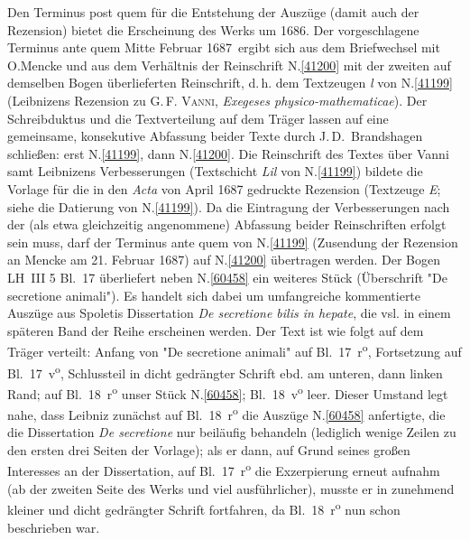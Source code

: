 \begin{ledgroup}
\pstart
Den Terminus post quem für die Entstehung der Auszüge (damit auch der Rezension)
bietet die Erscheinung des Werks um 1686.
Der vorgeschlagene Terminus ante quem \glqq Mitte Februar 1687\grqq\ 
ergibt sich aus dem Briefwechsel mit O.\;Mencke
und aus dem Verhältnis der Reinschrift N.\;\ref{41200} mit der zweiten auf demselben Bogen überlieferten Reinschrift, d.\,h. dem Textzeugen \textit{l} von N.\;\ref{41199} (Leibnizens Rezension zu
\indexN{\textls{Vanni}, Giovanni Francesco 1638\textendash1709}\textsc{G.\,F. Vanni}, \cite{02000}\textit{Exegeses physico-mathematicae}).
Der Schreibduktus und die Textverteilung auf dem Träger lassen auf eine gemeinsame, konsekutive Abfassung beider Texte durch J.\,D.~Brandshagen schließen: erst N.\;\ref{41199}, dann N.\;\ref{41200}.
Die Reinschrift des Textes über Vanni samt Leibnizens Verbesserungen (Textschicht \textit{Lil}  von N.\;\ref{41199})
bildete die Vorlage für die in den \cite{01023}\textit{Acta} von April 1687
gedruckte Rezension (Textzeuge \textit{E}; siehe die Datierung von N.\;\ref{41199}).
Da die Eintragung der Verbesserungen nach der (als etwa gleichzeitig angenommene) Abfassung beider Reinschriften erfolgt sein muss,
darf der Terminus ante quem von N.\;\ref{41199} (Zusendung der Rezension an Mencke am 21. Februar 1687) auf N.\;\ref{41200} übertragen werden.
\pend
\pstart
Der Bogen LH~III 5 Bl.~17 überliefert neben N.\;\ref{60458} ein weiteres Stück (Überschrift "De secretione animali"). Es handelt sich dabei um umfangreiche kommentierte Auszüge aus Spoletis Dissertation \textit{De secretione bilis in hepate}, die vsl. in einem späteren Band der Reihe erscheinen werden.
Der Text ist wie folgt auf dem Träger verteilt: Anfang von "De secretione animali" auf Bl.~17~r\textsuperscript{o}, Fortsetzung auf Bl.~17~v\textsuperscript{o}, Schlussteil in dicht gedrängter Schrift ebd. am unteren, dann linken Rand; auf Bl.~18~r\textsuperscript{o} unser Stück N.\;\ref{60458}; Bl.~18~v\textsuperscript{o} leer.
Dieser Umstand legt nahe, dass Leibniz zunächst auf Bl.~18~r\textsuperscript{o} die Auszüge N.\;\ref{60458}
anfertigte, die die Dissertation \textit{De secretione} nur beiläufig behandeln (lediglich wenige Zeilen zu den ersten drei Seiten der Vorlage);
als er dann, auf Grund seines großen Interesses an der Dissertation, auf Bl.~17~r\textsuperscript{o} die Exzerpierung erneut aufnahm (ab der zweiten Seite des Werks und viel ausführlicher), musste er in zunehmend kleiner und dicht gedrängter Schrift fortfahren, da Bl.~18~r\textsuperscript{o} nun schon beschrieben war.

\end{ledgroup}

